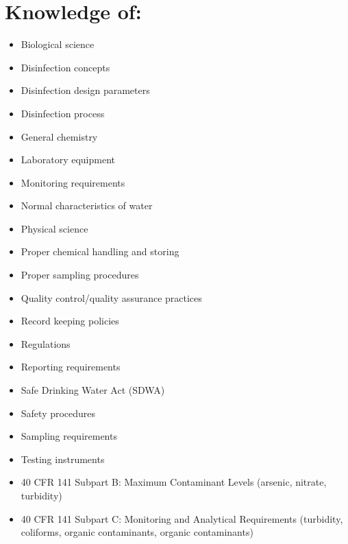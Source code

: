 \documentclass[10pt]{article}
\begin{document}
\section{Knowledge of:}
\begin{itemize}
  \item Biological science

  \item Disinfection concepts

  \item Disinfection design parameters

  \item Disinfection process

  \item General chemistry

  \item Laboratory equipment

  \item Monitoring requirements

  \item Normal characteristics of water

  \item Physical science

  \item Proper chemical handling and storing

  \item Proper sampling procedures

  \item Quality control/quality assurance practices

  \item Record keeping policies

  \item Regulations

  \item Reporting requirements

  \item Safe Drinking Water Act (SDWA)

  \item Safety procedures

  \item Sampling requirements

  \item Testing instruments

  \item 40 CFR 141 Subpart B: Maximum Contaminant Levels (arsenic, nitrate, turbidity)

  \item 40 CFR 141 Subpart C: Monitoring and Analytical Requirements (turbidity, coliforms, organic contaminants, organic contaminants)

\end{itemize}
\end{document}

